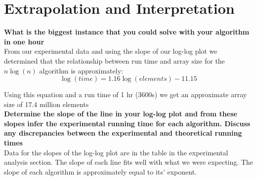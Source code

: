 \documentclass[a4paper,12pt]{article}
\begin{document}
\section*{Extrapolation and Interpretation}

\textbf{What is the biggest instance that you could solve with your algorithm in one hour}\\

From our experimental data and using the slope of our log-log plot we determined that the relationship between run time and array size for the $n\log(n)$ algorithm is approximately: 
$$\log(time) = 1.16\log(elements)- 11.15$$

Using this equation and a run time of 1 hr (3600s) we get an approximate array size of 17.4 million elements \\


\textbf{Determine the slope of the line in your log-log plot and from these slopes infer the experimental running time for each algorithm. Discuss any discrepancies between the experimental and theoretical running times}\\

Data for the slopes of the log-log plot are in the table in the experimental analysis section.  The slope of each line fits well with what we were expecting.  The slope of each algorithm is approximately equal to its' exponent.  
\end{document}
